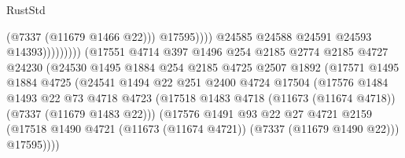 \begin{lexlean}{RustStd}
\begin{coremodule}
                                                      (@7337 (@11679 @1466 @22)))
                                                    @17595))))
                                            @24585
                                            @24588
                                            @24591
                                            @24593
                                            @14393)))))))))
                          (@17551
                            @4714
                            @397
                            @1496
                            @254
                            @2185
                            @2774
                            @2185
                            @4727
                            @24230
                            (@24530
                              @1495
                              @1884
                              @254
                              @2185
                              @4725
                              @2507
                              @1892
                              (@17571
                                @1495
                                @1884
                                @4725
                                (@24541
                                  @1494
                                  @22
                                  @251
                                  @2400
                                  @4724
                                  @17504
                                  (@17576
                                    @1484
                                    @1493
                                    @22
                                    @73
                                    @4718
                                    @4723
                                    (@17518
                                      @1483
                                      @4718
                                      (@11673 (@11674 @4718))
                                      (@7337 (@11679 @1483 @22)))
                                    (@17576
                                      @1491
                                      @93
                                      @22
                                      @27
                                      @4721
                                      @2159
                                      (@17518
                                        @1490
                                        @4721
                                        (@11673 (@11674 @4721))
                                        (@7337 (@11679 @1490 @22)))
                                      @17595))))

\end{coremodule}
\end{lexlean}
